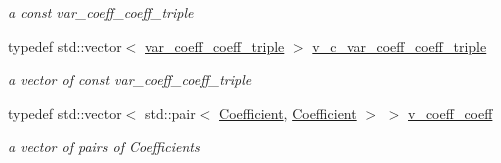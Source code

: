 \begin{DoxyCompactItemize}
\begin{DoxyCompactList}\small\item\em a const var\+\_\+coeff\+\_\+coeff\+\_\+triple \end{DoxyCompactList}\item 
\mbox{\label{class_s_m_spp__di__unipi__it_1_1_d_quad_function_adc080f133f994f0f0aa523cc52a0c368}} 
typedef std\+::vector$<$ \mbox{\hyperlink{class_s_m_spp__di__unipi__it_1_1_d_quad_function_a4da2c2c235cb90ba0e970725de950bf9}{var\+\_\+coeff\+\_\+coeff\+\_\+triple}} $>$ \mbox{\hyperlink{class_s_m_spp__di__unipi__it_1_1_d_quad_function_adc080f133f994f0f0aa523cc52a0c368}{v\+\_\+c\+\_\+var\+\_\+coeff\+\_\+coeff\+\_\+triple}}
\begin{DoxyCompactList}\small\item\em a vector of const var\+\_\+coeff\+\_\+coeff\+\_\+triple \end{DoxyCompactList}\item 
\mbox{\label{class_s_m_spp__di__unipi__it_1_1_d_quad_function_aa546e2c3b68bf3715752789800750d0b}} 
typedef std\+::vector$<$ std\+::pair$<$ \mbox{\hyperlink{class_s_m_spp__di__unipi__it_1_1_d_quad_function_a1fa0f848dbb8d52dc62a1adfee1a1f90}{Coefficient}}, \mbox{\hyperlink{class_s_m_spp__di__unipi__it_1_1_d_quad_function_a1fa0f848dbb8d52dc62a1adfee1a1f90}{Coefficient}} $>$ $>$ \mbox{\hyperlink{class_s_m_spp__di__unipi__it_1_1_d_quad_function_aa546e2c3b68bf3715752789800750d0b}{v\+\_\+coeff\+\_\+coeff}}
\begin{DoxyCompactList}\small\item\em a vector of pairs of Coefficients \end{DoxyCompactList}\end{DoxyCompactItemize}
